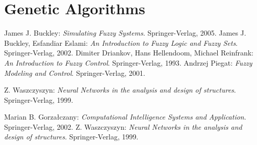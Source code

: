 \documentclass[12pt,a4paper]{scrartcl}
\begin{document}
\part{Genetic Algorithms}

\newpage



\newpage



\begin{thebibliography}{Waszczyszyn:2005}
	 James J. Buckley: \emph{Simulating Fuzzy Systems}. Springer-Verlag, 2005.
	 James J. Buckley, Esfandiar Eslami: \emph{An Introduction to Fuzzy Logic and Fuzzy Sets}. Springer-Verlag, 2002.
	 Dimiter Driankov, Hans Hellendoom, Michael Reinfrank: \emph{An Introduction to Fuzzy Control}. Springer-Verlag, 1993.
	 Andrzej Piegat: \emph{Fuzzy Modeling and Control}. Springer-Verlag, 2001.


	 Z. Waszczyszyn: \emph{Neural Networks in the analysis and design of structures}. Springer-Verlag, 1999.

	 Marian B. Gorza\l czany:  \emph{Computational Intelligence Systems and Application}. Springer-Verlag, 2002.
	 Z. Waszczyszyn: \emph{Neural Networks in the analysis and design of structures}. Springer-Verlag, 1999.
\end{thebibliography}
\end{document}
